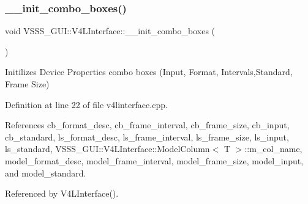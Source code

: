 \subsubsection{\texorpdfstring{\+\_\+\+\_\+init\+\_\+combo\+\_\+boxes()}{\_\_init\_combo\_boxes()}}
{\footnotesize\ttfamily void V\+S\+S\+S\+\_\+\+G\+U\+I\+::\+V4\+L\+Interface\+::\+\_\+\+\_\+init\+\_\+combo\+\_\+boxes (\begin{DoxyParamCaption}{ }\end{DoxyParamCaption})\hspace{0.3cm}{\ttfamily [private]}}



Initilizes Device Properties combo boxes (Input, Format, Intervals,Standard, Frame Size) 



Definition at line 22 of file v4linterface.\+cpp.



References cb\+\_\+format\+\_\+desc, cb\+\_\+frame\+\_\+interval, cb\+\_\+frame\+\_\+size, cb\+\_\+input, cb\+\_\+standard, ls\+\_\+format\+\_\+desc, ls\+\_\+frame\+\_\+interval, ls\+\_\+frame\+\_\+size, ls\+\_\+input, ls\+\_\+standard, V\+S\+S\+S\+\_\+\+G\+U\+I\+::\+V4\+L\+Interface\+::\+Model\+Column$<$ T $>$\+::m\+\_\+col\+\_\+name, model\+\_\+format\+\_\+desc, model\+\_\+frame\+\_\+interval, model\+\_\+frame\+\_\+size, model\+\_\+input, and model\+\_\+standard.



Referenced by V4\+L\+Interface().


